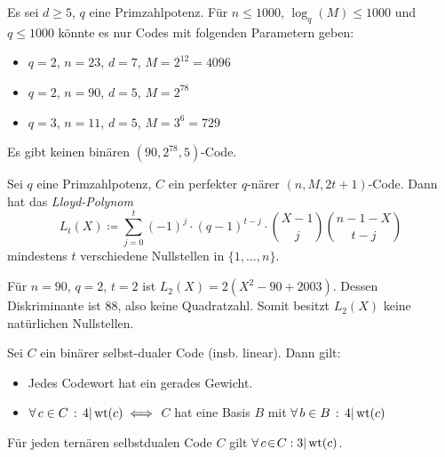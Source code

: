 \documentclass{cheat-sheet}
\DeclareMathOperator{\wt}{wt} %
\newcommand{\divides}{|} %
\newcommand{\Golay}{\mathcal{G}} %
\begin{document}
\begin{bem}
  Es sei $d \geq 5$, $q$ eine Primzahlpotenz.
  Für $n \leq 1000$, $\log_q(M) \leq 1000$ und $q \leq 1000$ könnte es nur Codes mit folgenden Parametern geben:
  \begin{itemize}
    \item $q=2$, $n=23$, $d=7$, $M=2^{12} = 4096$ %
    \item $q=2$, $n=90$, $d=5$, $M=2^{78}$
    \item $q=3$, $n=11$, $d=5$, $M=3^6=729$ %
  \end{itemize}
\end{bem}

\begin{satz}
  Es gibt keinen binären $(90, 2^{78}, 5)$-Code.
\end{satz}

\begin{bem}
  Sei $q$ eine Primzahlpotenz, $C$ ein perfekter $q$-närer $(n, M, 2t+1)$-Code.
  Dann hat das \emph{Lloyd-Polynom}
  \[ L_t(X) \coloneqq \sum_{j=0}^t (-1)^j \cdot (q-1)^{t-j} \cdot \binom{X-1}{j} \binom{n-1-X}{t-j} \]
  mindestens $t$ verschiedene Nullstellen in $\{ 1, \ldots, n \}$.
\end{bem}

\begin{bsp}
  Für $n=90$, $q=2$, $t=2$ ist $L_2(X) = 2 (X^2 - 90 + 2003)$.
  Dessen Diskriminante ist $88$, also keine Quadratzahl.
  Somit besitzt $L_2(X)$ keine natürlichen Nullstellen.
\end{bsp}

\begin{prop}
  Sei $C$ ein binärer selbst-dualer Code (insb. linear).
  Dann gilt:
  \begin{itemize}
    \item Jedes Codewort hat ein gerades Gewicht.
    \item $\fa{c \in C} 4 \divides \wt(c) \iff$ $C$ hat eine Basis $B$ mit $\fa{b \in B} 4 \divides \wt(c)$
  \end{itemize}
\end{prop}

\begin{prop}
  Für jeden ternären selbstdualen Code $C$ gilt $\fa{c \!\in\! C\!}\! 3 \divides \wt(c)$.
\end{prop}
\end{document}

